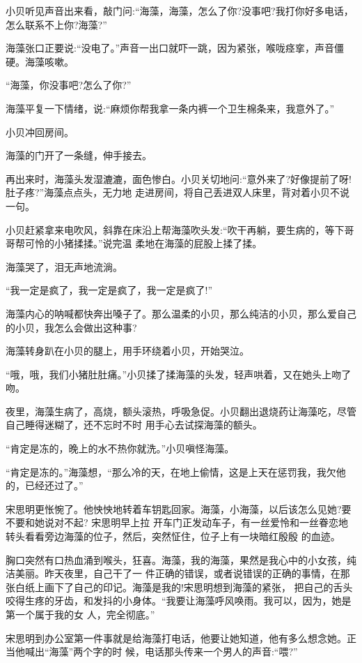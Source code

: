 \documentclass[11pt,a4paper,onecolumn]{article}
\begin{document}
小贝听见声音出来看，敲门问:``海藻，海藻，怎么了你?没事吧?我打你好多电话，怎么联系不上你?海藻?''

海藻张口正要说:``没电了。''声音一出口就吓一跳，因为紧张，喉咙痉挛，声音僵硬。海藻咳嗽。

``海藻，你没事吧?怎么了你?''

海藻平复一下情绪，说:``麻烦你帮我拿一条内裤一个卫生棉条来，我意外了。''

小贝冲回房间。

海藻的门开了一条缝，伸手接去。

再出来时，海藻头发湿漉漉，面色惨白。小贝关切地问:``意外来了?好像提前了呀!肚子疼?''海藻点点头，无力地
走进房间，将自己丢进双人床里，背对着小贝不说一句。

小贝赶紧拿来电吹风，斜靠在床沿上帮海藻吹头发:``吹干再躺，要生病的，等下哥哥帮可怜的小猪揉揉。''说完温
柔地在海藻的屁股上揉了揉。

海藻哭了，泪无声地流淌。

``我一定是疯了，我一定是疯了，我一定是疯了!''

海藻内心的呐喊都快奔出嗓子了。那么温柔的小贝，那么纯洁的小贝，那么爱自己的小贝，我怎么会做出这种事?

海藻转身趴在小贝的腿上，用手环绕着小贝，开始哭泣。

``哦，哦，我们小猪肚肚痛。''小贝揉了揉海藻的头发，轻声哄着，又在她头上吻了吻。

夜里，海藻生病了，高烧，额头滚热，呼吸急促。小贝翻出退烧药让海藻吃，尽管自己睡得迷糊了，还不忘时不时
用手心去试探海藻的额头。

``肯定是冻的，晚上的水不热你就洗。''小贝嗔怪海藻。

``肯定是冻的。''海藻想，``那么冷的天，在地上偷情，这是上天在惩罚我，我欠他的，已经还过了。''

宋思明更怅惋了。他怏怏地转着车钥匙回家。海藻，小海藻，以后该怎么见她?要不要和她说对不起? 宋思明早上拉
开车门正发动车子，有一丝爱怜和一丝眷恋地转头看看旁边海藻的位子，然后，突然怔住，位子上有一块暗红殷殷
的血迹。

胸口突然有口热血涌到喉头，狂喜。海藻，我的海藻，果然是我心中的小女孩，纯洁美丽。昨天夜里，自己干了一
件正确的错误，或者说错误的正确的事情，在那张白纸上画下了自己的印记。海藻是我的!宋思明想到海藻的紧张，
把自己的舌头咬得生疼的牙齿，和发抖的小身体。``我要让海藻呼风唤雨。我可以，因为，她是第一个属于我的女
人，完全彻底。''

宋思明到办公室第一件事就是给海藻打电话，他要让她知道，他有多么想念她。正当他喊出``海藻''两个字的时
候，电话那头传来一个男人的声音:``喂?''
\end{document}
